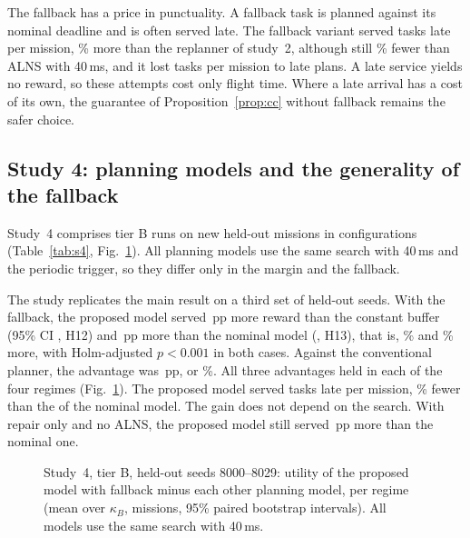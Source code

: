 
The fallback has a price in punctuality. A fallback task is planned against its nominal deadline and is often served
late. The fallback variant served  tasks late per mission, \% more than the replanner of
study~2, although still \% fewer than ALNS with 40\,ms, and it lost  tasks per mission
to late plans. A late service yields no reward, so these attempts cost only flight time. Where a late arrival has a
cost of its own, the guarantee of Proposition~\ref{prop:cc} without fallback remains the safer choice.

\subsection{Study 4: planning models and the generality of the fallback}\label{sec:study4}
Study~4 comprises  tier B runs on  new held-out missions in  configurations
(Table~\ref{tab:s4}, Fig.~\ref{fig:s4}). All planning models use the same search with 40\,ms and the periodic trigger,
so they differ only in the margin and the fallback.

The study replicates the main result on a third set of held-out seeds. With the fallback, the proposed model served
\,pp more reward than the constant buffer (95\% CI , H12) and \,pp
more than the nominal model (, H13), that is, \% and \% more, with
Holm-adjusted $p<0.001$ in both cases. Against the conventional planner, the advantage was \,pp, or
\%. All three advantages held in each of the four regimes (Fig.~\ref{fig:s4}). The proposed model
served  tasks late per mission, \% fewer than the  of the nominal model.
The gain does not depend on the search. With repair only and no ALNS, the proposed model still served
\,pp more than the nominal one.


\begin{figure}[t]
\centering
{}
\caption{Study~4, tier B, held-out seeds 8000--8029: utility of the proposed model with fallback minus each other
planning model, per regime (mean over $\kappa_B$,  missions, 95\% paired bootstrap intervals). All
models use the same search with 40\,ms.}\label{fig:s4}
\end{figure}

